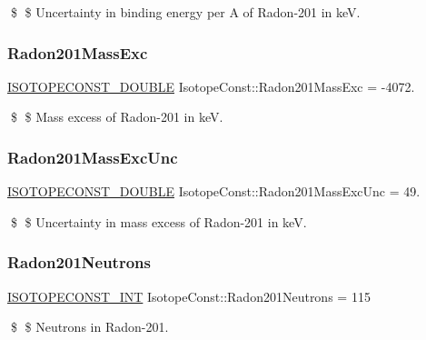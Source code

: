\$ \$ Uncertainty in binding energy per A of Radon-\/201 in keV. \mbox{\label{group___isotope_const-_radon-_rn201_ga9b3b085def459dda2ad5805a746bce9a}} 
\subsubsection{\texorpdfstring{Radon201\+Mass\+Exc}{Radon201MassExc}}
{\footnotesize\ttfamily \mbox{\hyperlink{group___isotope_const-_macros_ga8f45a7272ce02c0b4c65c44636ed719a}{I\+S\+O\+T\+O\+P\+E\+C\+O\+N\+S\+T\+\_\+\+D\+O\+U\+B\+LE}} Isotope\+Const\+::\+Radon201\+Mass\+Exc = -\/4072.}

\$ \$ Mass excess of Radon-\/201 in keV. \mbox{\label{group___isotope_const-_radon-_rn201_gad93b12a0e0ef6f288e8082a0f871b526}} 
\subsubsection{\texorpdfstring{Radon201\+Mass\+Exc\+Unc}{Radon201MassExcUnc}}
{\footnotesize\ttfamily \mbox{\hyperlink{group___isotope_const-_macros_ga8f45a7272ce02c0b4c65c44636ed719a}{I\+S\+O\+T\+O\+P\+E\+C\+O\+N\+S\+T\+\_\+\+D\+O\+U\+B\+LE}} Isotope\+Const\+::\+Radon201\+Mass\+Exc\+Unc = 49.}

\$ \$ Uncertainty in mass excess of Radon-\/201 in keV. \mbox{\label{group___isotope_const-_radon-_rn201_ga7070e28864d1477187068aae00c2a3e0}} 
\subsubsection{\texorpdfstring{Radon201\+Neutrons}{Radon201Neutrons}}
{\footnotesize\ttfamily \mbox{\hyperlink{group___isotope_const-_macros_ga5f18360b3e99483a35c32d789e62621c}{I\+S\+O\+T\+O\+P\+E\+C\+O\+N\+S\+T\+\_\+\+I\+NT}} Isotope\+Const\+::\+Radon201\+Neutrons = 115}

\$ \$ Neutrons in Radon-\/201. \mbox{\label{group___isotope_const-_radon-_rn201_gac9f96e6a338906eed82b80f381397d88}} 
